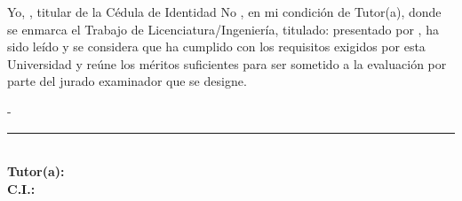 Yo, \textbf{\datosTutorNombre}, titular de la Cédula de Identidad No
\textbf{\datosTutorCI}, en mi condición de Tutor(a), donde se enmarca
el Trabajo de Licenciatura/Ingeniería, titulado: \textbf{\datosTitulo}
presentado por \autoresAprob, ha sido leído y se considera que ha
cumplido con los requisitos exigidos por esta Universidad y reúne los
méritos suficientes para ser sometido a la evaluación por parte del
jurado examinador que se designe.

\vfill

\begin{flushleft}
    \lugarPresentacion \- - \fechaPresentacion
\end{flushleft}

\vspace{1cm}

\begin{minipage}{0.5\textwidth}
\centering
\rule{6cm}{0.4pt}\\ %
\textbf{Tutor(a):} \textbf{\datosTutorNombre}\\
\textbf{C.I.: \datosTutorCI}
\end{minipage}
